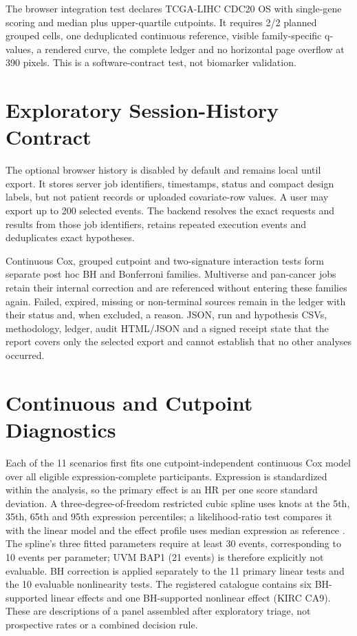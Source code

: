 \documentclass[12pt]{article}
\begin{document}
The browser integration test declares TCGA-LIHC CDC20 OS with single-gene
scoring and median plus upper-quartile cutpoints. It requires 2/2 planned
grouped cells, one deduplicated continuous reference, visible family-specific
q-values, a rendered curve, the complete ledger and no horizontal page
overflow at 390 pixels. This is a software-contract test, not biomarker
validation.

\section*{Exploratory Session-History Contract}

The optional browser history is disabled by default and remains local until
export. It stores server job identifiers, timestamps, status and compact design
labels, but not patient records or uploaded covariate-row values. A user may
export up to 200 selected events. The backend resolves the exact requests and
results from those job identifiers, retains repeated execution events and
deduplicates exact hypotheses.

Continuous Cox, grouped cutpoint and two-signature interaction tests form
separate post hoc BH and Bonferroni families. Multiverse and pan-cancer jobs
retain their internal correction and are referenced without entering these
families again. Failed, expired, missing or non-terminal sources remain in the
ledger with their status and, when excluded, a reason. JSON, run and hypothesis
CSVs, methodology,
ledger, audit HTML/JSON and a signed receipt state that the report covers only
the selected export and cannot establish that no other analyses occurred.

\section*{Continuous and Cutpoint Diagnostics}

Each of the 11 scenarios first fits one cutpoint-independent continuous Cox
model over all eligible expression-complete participants. Expression is
standardized within the analysis, so the primary effect is an HR per one score
standard deviation. A three-degree-of-freedom restricted cubic spline uses
knots at the 5th, 35th, 65th and 95th expression percentiles; a
likelihood-ratio test compares it with the linear model and the effect profile
uses median expression as reference \citep{harrell2015rms}. The spline's three
fitted parameters require at least 30 events, corresponding to 10 events per
parameter; UVM BAP1 (21 events) is therefore explicitly not evaluable. BH
correction is applied separately to the 11 primary linear tests and the 10
evaluable nonlinearity tests. The registered catalogue contains six
BH-supported linear effects and one BH-supported nonlinear effect (KIRC CA9).
These are descriptions of a panel assembled after exploratory triage, not
prospective rates or a combined decision rule.
\end{document}
